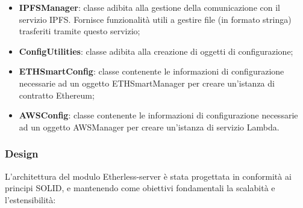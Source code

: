 \begin{itemize}
	\item \textbf{IPFSManager}: classe adibita alla gestione della comunicazione con il servizio IPFS. Fornisce funzionalità utili a gestire file (in formato stringa) trasferiti tramite questo servizio;
	\item \textbf{ConfigUtilities}: classe adibita alla creazione di oggetti di configurazione;
	\item \textbf{ETHSmartConfig}: classe contenente le informazioni di configurazione necessarie ad un oggetto ETHSmartManager per creare un'istanza di contratto Ethereum;
	\item \textbf{AWSConfig}: classe contenente le informazioni di configurazione necessarie ad un oggetto AWSManager per creare un'istanza di servizio Lambda.
\end{itemize}
\subsubsection{Design}
L'architettura del modulo Etherless-server è stata progettata in conformità ai principi SOLID, e mantenendo come obiettivi fondamentali la scalabità e l'estensibilità:
